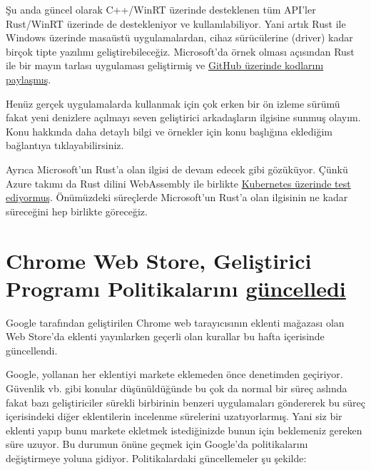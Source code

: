 \documentclass[11pt]{article}
\begin{document}
Şu anda güncel olarak C++/WinRT üzerinde desteklenen tüm API'ler Rust/WinRT
üzerinde de destekleniyor ve kullanılabiliyor. Yani artık Rust ile Windows
üzerinde masaüstü uygulamalardan, cihaz sürücülerine (driver) kadar birçok
tipte yazılımı geliştirebileceğiz. Microsoft'da örnek olması açısından Rust
ile bir mayın tarlası uygulaması geliştirmiş ve \href{https://github.com/robmikh/minesweeper-rs}{GitHub üzerinde kodlarını
paylaşmış}.

Henüz gerçek uygulamalarda kullanmak için çok erken bir ön izleme sürümü fakat
yeni denizlere açılmayı seven geliştirici arkadaşların ilgisine sunmuş olayım.
Konu hakkında daha detaylı bilgi ve örnekler için konu başlığına eklediğim
bağlantıya tıklayabilirsiniz.

Ayrıca Microsoft'un Rust'a olan ilgisi de devam edecek gibi gözüküyor. Çünkü
Azure takımı da Rust dilini WebAssembly ile birlikte \href{https://www.zdnet.com/article/microsoft-why-we-used-programming-language-rust-over-go-for-webassembly-on-kubernetes-app/}{Kubernetes üzerinde test
ediyormuş}. Önümüzdeki süreçlerde Microsoft'un Rust'a olan ilgisinin ne kadar
süreceğini hep birlikte göreceğiz.
\section{Chrome Web Store, Geliştirici Programı Politikalarını \href{https://blog.chromium.org/2020/04/keeping-spam-off-chrome-web-store.html}{güncelledi}}
\label{sec:orgc81395d}
Google tarafından geliştirilen Chrome web tarayıcısının eklenti mağazası olan
Web Store'da eklenti yayınlarken geçerli olan kurallar bu hafta içerisinde
güncellendi.

Google, yollanan her eklentiyi markete eklemeden önce denetimden geçiriyor.
Güvenlik vb. gibi konular düşünüldüğünde bu çok da normal bir süreç aslında
fakat bazı geliştiriciler sürekli birbirinin benzeri uygulamaları göndererek
bu süreç içerisindeki diğer eklentilerin incelenme sürelerini uzatıyorlarmış.
Yani siz bir eklenti yapıp bunu markete ekletmek istediğinizde bunun için
beklemeniz gereken süre uzuyor. Bu durumun önüne geçmek için Google'da
politikalarını değiştirmeye yoluna gidiyor. Politikalardaki güncellemeler şu
şekilde:
\end{document}
